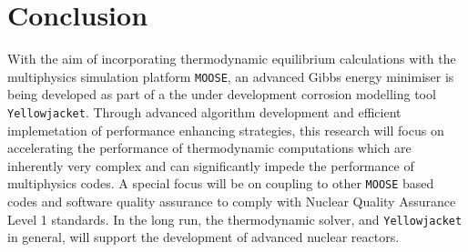 \section*{Conclusion}
With the aim of incorporating thermodynamic equilibrium calculations with the multiphysics simulation platform \texttt{MOOSE}, an advanced Gibbs energy minimiser is being developed as part of a the under development corrosion modelling tool \texttt{Yellowjacket}. Through advanced algorithm development and efficient implemetation of performance enhancing strategies, this research will focus on accelerating the performance of thermodynamic computations which are inherently very complex and can significantly impede the performance of multiphysics codes. A special focus will be on coupling to other \texttt{MOOSE} based codes and software quality assurance to comply with Nuclear Quality Assurance Level 1 standards. In the long run, the thermodynamic solver, and \texttt{Yellowjacket} in general, will support the development of advanced nuclear reactors.
